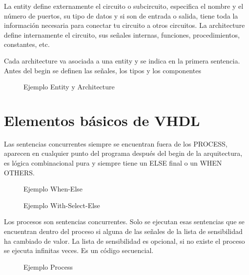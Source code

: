 La entity define externamente el circuito o subcircuito,  especifica el nombre y el número de puertos, su tipo de datos y si son de entrada o salida, tiene toda la información necesaria para conectar tu circuito a otros circuitos.
La architecture define internamente el circuito, sus señales internas, funciones, procedimientos, constantes, etc.


Cada architecture va asociada a una entity y se indica en la primera sentencia. Antes del begin se definen las señales, los tipos y los componentes

\begin{figure}[H]
	\centering
	
	\caption{Ejemplo Entity y Architecture}
\end{figure}

\section{Elementos básicos de VHDL}

Las sentencias concurrentes siempre se encuentran fuera de los PROCESS, aparecen en cualquier punto del programa después del begin de la arquitectura,  es lógica combinacional pura y siempre tiene un ELSE final o un WHEN OTHERS.

\begin{multicols}{2}
	\begin{figure}[H]
		\centering
		
		\caption{Ejemplo When-Else}
	\end{figure}
	\vfill
	\begin{figure}[H]
		\centering
		
		\caption{Ejemplo With-Select-Else}
	\end{figure}
\end{multicols}


Los procesos son sentencias concurrentes. Solo se ejecutan esas sentencias que se encuentran dentro del proceso si alguna de las señales de la lista de sensibilidad ha cambiado de valor. La lista de sensibilidad es opcional, si no existe el proceso se ejecuta infinitas veces. Es un código secuencial.
\begin{figure}[H]
	\centering
	
	\caption{Ejemplo Process}
\end{figure}

